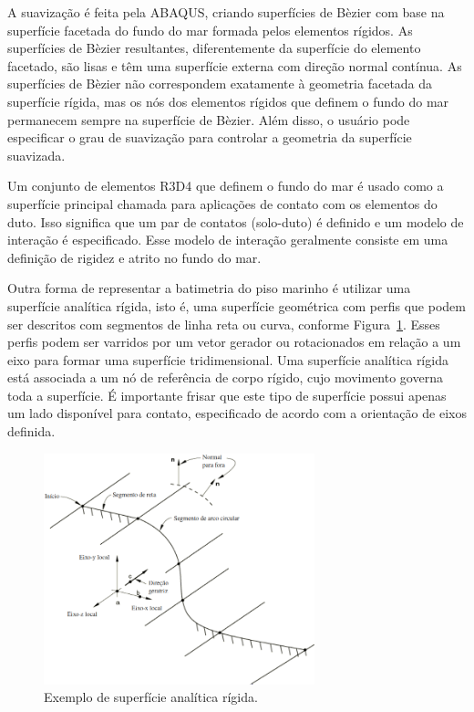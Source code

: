 A suavização é feita pela ABAQUS, criando superfícies de Bèzier com base na superfície facetada do fundo do mar formada pelos elementos rígidos. As superfícies de Bèzier resultantes, diferentemente da superfície do elemento facetado, são lisas e têm uma superfície externa com direção normal contínua. As superfícies de Bèzier não correspondem exatamente à geometria facetada da superfície rígida, mas os nós dos elementos rígidos que definem o fundo do mar permanecem sempre na superfície de Bèzier. Além disso, o usuário pode especificar o grau de suavização para controlar a geometria da superfície suavizada.

Um conjunto de elementos R3D4 que definem o fundo do mar é usado como a superfície principal chamada para aplicações de contato com os elementos do duto. Isso significa que um par de contatos (solo-duto) é definido e um modelo de interação é especificado. Esse modelo de interação geralmente consiste em uma definição de rigidez e atrito no fundo do mar.




Outra forma de representar a batimetria do piso marinho é utilizar uma superfície analítica rígida, isto é, uma superfície geométrica com perfis que podem ser descritos com segmentos de linha reta ou curva, conforme Figura~\ref{fig:superficie_analitica}. Esses perfis podem ser varridos por um vetor gerador ou rotacionados em relação a um eixo para formar uma superfície tridimensional. Uma superfície analítica rígida está associada a um nó de referência de corpo rígido, cujo movimento governa toda a superfície. É importante frisar que este tipo de superfície possui apenas um lado disponível para contato, especificado de acordo com a orientação de eixos definida.

\begin{figure}[!ht]
    \centering
    \caption{Exemplo de superfície analítica rígida.}\label{fig:superficie_analitica}
    \includegraphics[width=0.7\textwidth]{imagens/superficie_analitica}
\end{figure}

